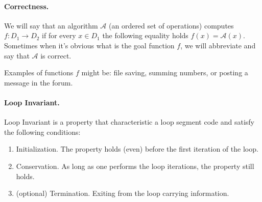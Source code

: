 \paragraph{Correctness.} We will say that an algorithm \( \mathcal{A}\) (an ordered set of operations) computes \( f:D_1 \rightarrow D_2 \) if for every \(x \in D_1\) the following equality holds \(f(x) = \mathcal{A}(x)\). Sometimes when it's obvious what is the goal function \(f\), we will abbreviate and say that \( \mathcal{A}\) is correct.       

Examples of functions \(f\) might be: file saving, summing numbers, or posting a message in the forum.  

\paragraph{Loop Invariant.} Loop Invariant is a property that characteristic a loop segment code  and satisfy the following conditions: 
\begin{enumerate}
    \item Initialization. The property holds (even) before the first iteration of the loop.   
    \item Conservation. As long as one performs the loop iterations, the property still holds.
    \item (optional) Termination. Exiting from the loop carrying information.
\end{enumerate}

